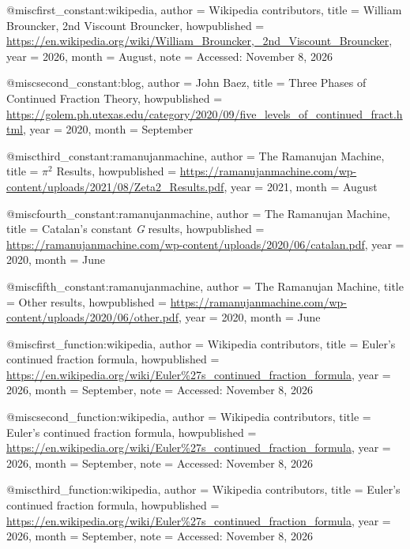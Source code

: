 @misc{first_constant:wikipedia,
    author = {Wikipedia contributors},
    title = {William Brouncker, 2nd Viscount Brouncker},
    howpublished = {\url{https://en.wikipedia.org/wiki/William_Brouncker,_2nd_Viscount_Brouncker}},
    year = {2026},
    month = {August},
    note = {Accessed: November 8, 2026}
}

@misc{second_constant:blog,
    author = {John Baez},
    title = {Three Phases of Continued Fraction Theory},
    howpublished = {\url{https://golem.ph.utexas.edu/category/2020/09/five_levels_of_continued_fract.html}},
    year = {2020},
    month = {September}
}

@misc{third_constant:ramanujanmachine,
    author = {The Ramanujan Machine},
    title = {{$\pi^2$} Results},
    howpublished = {\url{https://ramanujanmachine.com/wp-content/uploads/2021/08/Zeta2_Results.pdf}},
    year = {2021},
    month = {August}
}

@misc{fourth_constant:ramanujanmachine,
    author = {The Ramanujan Machine},
    title = {Catalan's constant \textit{G} results},
    howpublished = {\url{https://ramanujanmachine.com/wp-content/uploads/2020/06/catalan.pdf}},
    year = {2020},
    month = {June}
}

@misc{fifth_constant:ramanujanmachine,
    author = {The Ramanujan Machine},
    title = {Other results},
    howpublished = {\url{https://ramanujanmachine.com/wp-content/uploads/2020/06/other.pdf}},
    year = {2020},
    month = {June}
}

@misc{first_function:wikipedia,
    author = {Wikipedia contributors},
    title = {Euler's continued fraction formula},
    howpublished = {\url{https://en.wikipedia.org/wiki/Euler%27s_continued_fraction_formula}},
    year = {2026},
    month = {September},
    note = {Accessed: November 8, 2026}
}

@misc{second_function:wikipedia,
    author = {Wikipedia contributors},
    title = {Euler's continued fraction formula},
    howpublished = {\url{https://en.wikipedia.org/wiki/Euler%27s_continued_fraction_formula}},
    year = {2026},
    month = {September},
    note = {Accessed: November 8, 2026}
}

@misc{third_function:wikipedia,
    author = {Wikipedia contributors},
    title = {Euler's continued fraction formula},
    howpublished = {\url{https://en.wikipedia.org/wiki/Euler%27s_continued_fraction_formula}},
    year = {2026},
    month = {September},
    note = {Accessed: November 8, 2026}
}

